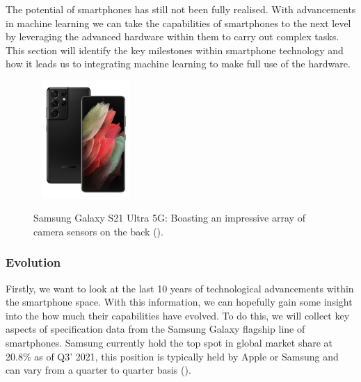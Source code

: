 \documentclass{article}
\begin{document}
The potential of smartphones has still not been fully realised. With advancements in machine learning we can take the 
capabilities of smartphones to the next level by leveraging the advanced hardware within them to carry out complex 
tasks. This section will identify the key milestones within smartphone technology and how it leads us to integrating 
machine learning to make full use of the hardware.

\begin{figure}[h]\
    \centering
    \includegraphics[width=0.3\textwidth]{s21ultra.jpg}
    \caption{Samsung Galaxy S21 Ultra 5G: Boasting an impressive array of camera sensors on the back (\cite{three2021}).}
\end{figure}

\subsubsection{Evolution}

Firstly, we want to look at the last 10 years of technological advancements within the smartphone space. 
With this information, we can hopefully gain some insight into the how much their capabilities have evolved. To do this, 
we will collect key aspects of specification data from the Samsung Galaxy flagship line of smartphones. Samsung 
currently hold the top spot in global market share at 20.8\% as of Q3' 2021, this position is typically held by Apple or
Samsung and can vary from a quarter to quarter basis (\cite{odea2021}).
\end{document}
